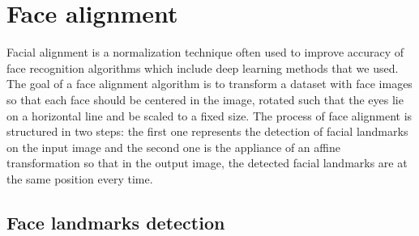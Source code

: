 \section{Face alignment}
Facial alignment is a normalization technique often used to improve accuracy of face recognition algorithms which include deep learning methods that we used. The goal of a face alignment algorithm is to transform a dataset with face images so that each face should be centered in the image, rotated such that the eyes lie on a horizontal line and be scaled to a fixed size.
The process of face alignment is structured in two steps: the first one represents the detection of facial landmarks on the input image and the second one is the appliance of an affine transformation so that in the output image, the detected facial landmarks are at the same position every time.
\subsection{Face landmarks detection}
